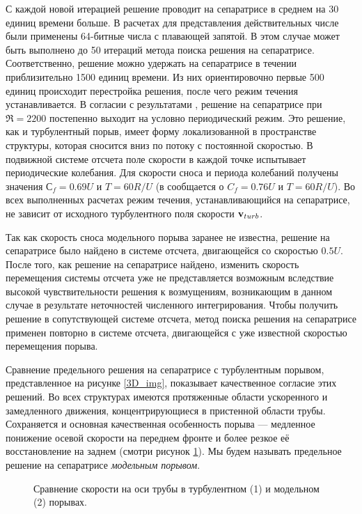 С каждой новой итерацией решение проводит на сепаратрисе в среднем на 30 единиц времени больше. В расчетах для представления действительных числе были применены 64-битные числа с плавающей запятой. В этом случае может быть выполнено до 50 итераций метода поиска решения на сепаратрисе. Соответственно, решение можно удержать на сепаратрисе в течении приблизительно 1500 единиц времени. Из них ориентировочно первые 500 единиц происходит перестройка решения, после чего режим течения устанавливается. В согласии с результатами \cite{Avila2013}, решение на сепаратрисе при $\Re=2200$ постепенно выходит на условно периодический режим. Это решение, как и турбулентный порыв, имеет форму локализованной в пространстве структуры, которая сносится вниз по потоку с постоянной скоростью. В подвижной системе отсчета поле скорости в каждой точке испытывает периодические колебания. Для скорости сноса и периода колебаний получены значения $С_f=0.69U$ и $T=60R/U$ (в \cite{Avila2013} сообщается о $C_f=0.76U$ и $T=60R/U$). Во всех выполненных расчетах режим течения, устанавливающийся на сепаратрисе, не зависит от исходного турбулентного поля скорости $\mathbf{v}_{turb}$. 

Так как скорость сноса модельного порыва заранее не известна, решение на сепаратрисе было найдено в системе отсчета, двигающейся со скоростью $0.5U$. После того, как решение на сепаратрисе найдено, изменить скорость перемещения системы отсчета уже не представляется возможным вследствие высокой чувствительности решения к возмущениям, возникающим в данном случае в результате неточностей численного интегрирования. Чтобы получить решение в сопутствующей системе отсчета, метод поиска решения на сепаратрисе применен повторно в системе отсчета, двигающейся с уже известной скоростью перемещения порыва. 

Сравнение предельного решения на сепаратрисе с турбулентным порывом, представленное на рисунке \ref{3D_img}, показывает качественное согласие этих решений. Во всех структурах имеются протяженные области ускоренного и замедленного движения, концентрирующиеся в пристенной области трубы. Сохраняется и основная качественная особенность порыва --- медленное понижение осевой скорости на переднем фронте и более резкое её восстановление на заднем (смотри рисунок \ref{ucl_cmp_img}). Мы будем называть предельное решение на сепаратрисе {\it модельным порывом}.  

\begin{figure}
\caption{Сравнение скорости на оси трубы в турбулентном (1) и модельном (2) порывах.}
\label{ucl_cmp_img}
\end{figure}

